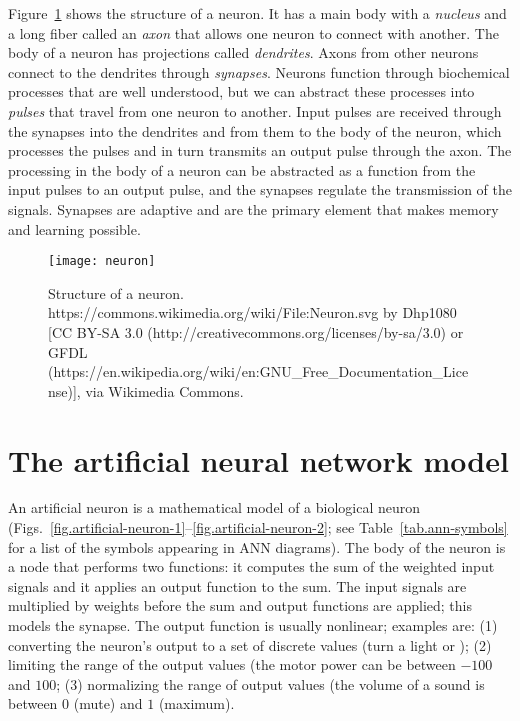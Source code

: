 Figure~\ref{fig.neuron} shows the structure of a neuron. It has a main body with a \emph{nucleus} and a long fiber called an \emph{axon} that allows one neuron to connect with another. The body of a neuron has projections called \emph{dendrites}. Axons from other neurons connect to the dendrites through \emph{synapses}. Neurons function through biochemical processes that are well understood, but we can abstract these processes into \emph{pulses} that travel from one neuron to another. Input pulses are received through the synapses into the dendrites and from them to the body of the neuron, which processes the pulses and in turn transmits an output pulse through the axon. The processing in the body of a neuron can be abstracted as a function from the input pulses to an output pulse, and the synapses regulate the transmission of the signals. Synapses are adaptive and are the primary element that makes memory and learning possible.

\begin{figure}
\begin{center}
\texttt{[image: neuron]}
\end{center}
\caption{Structure of a neuron. https://commons.wikimedia.org/wiki/File:Neuron.svg by Dhp1080 [CC BY-SA 3.0 (http://creativecommons.org/licenses/by-sa/3.0) or GFDL (https://en.wikipedia.org/wiki/en:GNU\_Free\_Documentation\_License)], via Wikimedia Commons.
}\label{fig.neuron}
\end{figure}

\section{The artificial neural network model}\label{s.ann}

An artificial neuron is a mathematical model of a biological neuron (Figs.~\ref{fig.artificial-neuron-1}--\ref{fig.artificial-neuron-2}; see Table~\ref{tab.ann-symbols} for a list of the symbols appearing in ANN diagrams). The body of the neuron is a node that performs two functions: it computes the sum of the weighted input signals and it applies an output function to the sum. The input signals are multiplied by weights before the sum and output functions are applied; this models the synapse. The output function is usually nonlinear; examples are: (1) converting the neuron's output to a set of discrete values (turn a light  or ); (2) limiting the range of the output values (the motor power can be between $-100$ and $100$; (3) normalizing the range of output values (the volume of a sound is between $0$ (mute) and $1$ (maximum).

